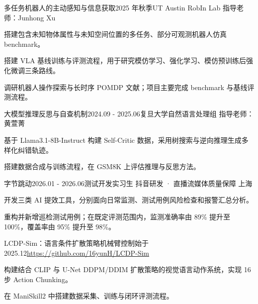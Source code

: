 \documentclass[10pt,a4paper]{article}
\begin{document}
\begin{cventry}{多任务机器人的主动感知与信息获取}{2025 年秋季}{UT Austin RobIn Lab \textbar{} 指导老师：Junhong Xu}
\begin{cvitems}
\item 搭建包含未知物体属性与未知空间位置的多任务、部分可观测机器人仿真 benchmark。
\item 搭建 VLA 基线训练与评测流程，用于研究模仿学习、强化学习、模仿预训练后强化微调三条路线。
\item 调研机器人操作探索与长时序 POMDP 文献；项目主要完成 benchmark 与基线评测流程。
\end{cvitems}
\end{cventry}

\begin{cventry}{大模型推理反思与自查机制}{2024.09 - 2025.06}{复旦大学自然语言处理组 \textbar{} 指导老师：黄萱菁}
\begin{cvitems}
\item 基于 Llama3.1-8B-Instruct 构建 Self-Critic 数据，采用树搜索与逆向推理生成多样化纠错轨迹。
\item 搭建数据合成与训练流程，在 GSM8K 上评估推理与反思方法。
\end{cvitems}
\end{cventry}



\newpage
{}
\begin{cventry}{字节跳动}{2026.01 - 2026.06}{测试开发实习生 \textbar{} 抖音研发 · 直播流媒体质量保障 \textbar{} 上海}
\begin{cvitems}
\item 开发三类 AI 提效工具，分别面向日常监测、测试用例风险检查和报警汇总分析。
\item 重构并新增巡检测试用例；在既定评测范围内，监测准确率由 89\% 提升至 100\%，覆盖率由 95\% 提升至 98\%。
\end{cvitems}
\end{cventry}

\begin{cventry}{LCDP-Sim：语言条件扩散策略机械臂控制}{始于 2025.12}{\href{https://github.com/16yunH/LCDP-Sim}{https://github.com/16yunH/LCDP-Sim}}
\begin{cvitems}
\item 构建结合 CLIP 与 U-Net DDPM/DDIM 扩散策略的视觉语言动作系统，实现 16 步 Action Chunking。
\item 在 ManiSkill2 中搭建数据采集、训练与闭环评测流程。
\end{cvitems}
\end{cventry}
\end{document}
